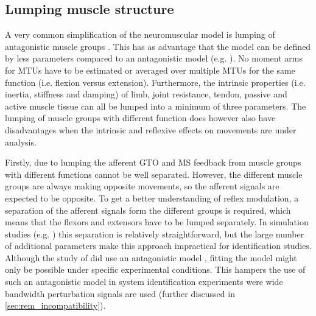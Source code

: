 

\subsection{Lumping muscle structure}
\label{sec:rem_lumping-muscle}
A very common simplification of the neuromuscular model is lumping of antagonistic muscle groups \cite{zhang_simultaneous_1997, van_der_helm_identification_2002, schouten_nmclab_2008, mugge_rigorous_2010}. This has as advantage that the model can be defined by less parameters compared to an antagonistic model (e.g. \cite{de_gooijer-van_de_groep_estimation_2016}). No moment arms for MTUs have to be estimated or averaged over multiple MTUs for the same function (i.e. flexion versus extension). Furthermore, the intrinsic properties (i.e. inertia, stiffness and damping) of limb, joint resistance, tendon, passive and active muscle tissue can all be lumped into a minimum of three parameters. The lumping of muscle groups with different function does however also have disadvantages when the intrinsic and reflexive effects on movements are under analysis. 

Firstly, due to lumping the afferent GTO and MS feedback from muscle groups with different functions cannot be well separated. However, the different muscle groups are always making opposite movements, so the afferent signals are expected to be opposite. To get a better understanding of reflex modulation, a separation of the afferent signals form the different groups is required, which means that the flexors and extensors have to be lumped separately. In simulation studies (e.g. \cite{mugge_modeling_2012}) this separation is relatively straightforward, but the large number of additional parameters make this approach impractical for identification studies. Although the study of \citeauthor{de_gooijer-van_de_groep_estimation_2016} did use an antagonistic model \cite{de_gooijer-van_de_groep_estimation_2016}, fitting the model might only be possible under specific experimental conditions. This hampers the use of such an antagonistic model in system identification experiments were wide bandwidth perturbation signals are used (further discussed in \autoref{sec:rem_incompatibility}).

